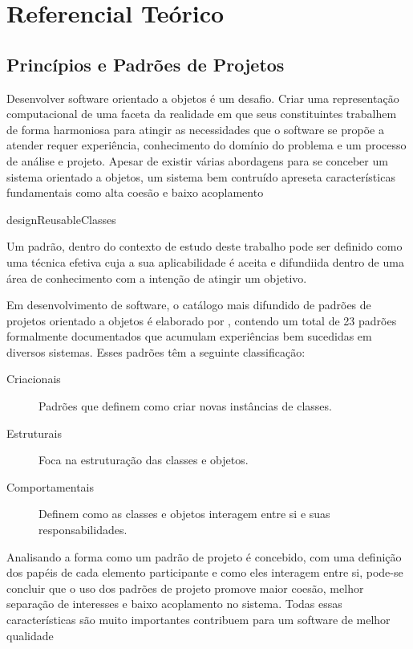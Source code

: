\chapter{Referencial Teórico}

\section{Princípios e Padrões de Projetos}

Desenvolver software orientado a objetos é um desafio. Criar uma representação
computacional de uma faceta da realidade em que seus constituintes trabalhem de
forma harmoniosa para atingir as necessidades que o software se propõe a
atender requer experiência, conhecimento do domínio do problema e um processo de
análise e projeto. Apesar de existir várias abordagens para se conceber um
sistema orientado a objetos\cite{evans2004ddd},\cite{gomma11} um sistema bem
contruído apreseta características fundamentais como alta coesão e
baixo acoplamento 

designReusableClasses

Um padrão, dentro do contexto de estudo deste trabalho pode ser definido
como uma técnica efetiva cuja a sua aplicabilidade é aceita e difundiida dentro
de uma área de conhecimento com a intenção de atingir um
objetivo\cite{MetskerWake06}.

Em desenvolvimento de software, o catálogo mais difundido de padrões de projetos
orientado a objetos é elaborado por , contendo um total de 23
padrões formalmente documentados que acumulam experiências bem sucedidas em
diversos sistemas. Esses padrões têm a seguinte classificação:

\begin{description}
\item[Criacionais] Padrões que definem como criar novas instâncias de classes.
\item[Estruturais] Foca na estruturação das classes e objetos.
\item[Comportamentais] Definem como as classes e objetos interagem entre si e
suas responsabilidades.
\end{description}

Analisando a forma como um padrão de projeto é concebido, com uma definição
dos papéis de cada elemento participante e como eles interagem entre si,
pode-se concluir que o uso dos padrões de projeto promove maior coesão, melhor
separação de interesses e baixo acoplamento no sistema. Todas essas características são muito
importantes contribuem para um software de melhor qualidade

